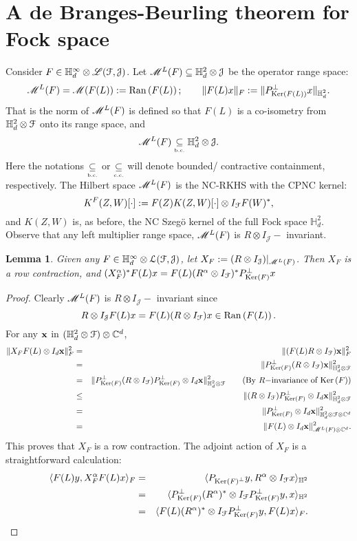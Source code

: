 \documentclass[11pt]{article}
\newcommand{\ba}{\begin{eqnarray}}
\newcommand{\ea}{\end{eqnarray}}
\newcommand{\nn}{\nonumber}
\newcommand{\scr}{\ensuremath{\mathscr}}
\newcommand{\mbf}{\ensuremath{\mathbf}}
\newcommand{\mc}{\ensuremath{\mathcal}}
\def\C{\mathbb{C}}
\def\bH{\mathbb{H}}
\def\bc{\underset{\mbox{\tiny \mbox{\tiny b.c.}}}{\subseteq}}
\def\cc{\underset{\mbox{\tiny \mbox{\tiny c.c.}}}{\subseteq}}
\newcommand{\J}{\ensuremath{\mathcal{J} }}
\renewcommand{\L}{\ensuremath{\mathscr{L} }}
\newcommand{\ip}[2]{\ensuremath{\langle {#1} , {#2} \rangle}}
\newcommand{\ran}[1]{\ensuremath{\mathrm{Ran} \left( {#1} \right) }}
\renewcommand{\ker}[1]{\ensuremath{\mathrm{Ker} \left( {#1} \right) }}
\numberwithin{equation}{section}
\numberwithin{subsection}{section}
\newtheorem{lemma}[subsection]{Lemma}
\theoremstyle{definition}
\begin{document}
\section{A de Branges-Beurling theorem for Fock space}

Consider $F \in \bH ^\infty _d  \otimes \L ( \mc{F} , \mc{J} )$.  Let $\scr{M} ^L  (F) \subseteq \bH ^2 _d \otimes \J$ be the operator range space:
$$ \scr{M} ^L  (F) =\scr{M} (F(L)) := \ran{F(L)}; \quad \quad \| F(L) x \| _{F } := \| P_{\ker{F(L)}} ^\perp x \|  _{\bH ^2 _d}. $$ That is the norm of $\scr{M} ^L  (F)$ is defined so that $F(L) $ is a co-isometry from $\bH ^2 _d \otimes \mc{F}$ onto its range space, and $$ \scr{M} ^L (F) \underset{\mbox{\tiny \mbox{\tiny b.c.}}}{\subseteq} \bH ^2 _d \otimes \J. $$ Here the notations $\bc $ or $\cc $ will denote bounded/ contractive containment, respectively. The Hilbert space $\scr{M} ^L (F)$ is the NC-RKHS with the CPNC kernel:
$$ K^F (Z,W) [ \cdot ] := F(Z) K(Z,W) [\cdot ] \otimes I_{\mc{F}} F(W) ^*, $$ and $K(Z,W)$ is, as before, the NC Szeg\"o kernel of the full Fock space $\bH ^2 _d$. Observe that any left multiplier range space, $\scr{M} ^L (F)$ is $R \otimes I_\J -$ invariant.

\begin{lemma} \label{rowcontract}
Given any $F \in \bH ^\infty _d \otimes \mc{L} (\mc{F}, \J ) $, let $X_F := (R \otimes I_\J ) | _{\scr{M} ^L (F)} $. Then $X_F$ is a row contraction, and $(X_F ^\alpha ) ^*  F(L) x  = F(L) (R^\alpha \otimes I _{\mc{F}} ) ^* P _{\ker{F}} ^\perp x $
\end{lemma}
\begin{proof}
Clearly $\scr{M} ^L (F)$ is $R \otimes I_\J -$ invariant since 
$$ R \otimes I_\J F(L) x = F(L) (R \otimes I_\mc{F} ) x \in \ran{F(L)}. $$
For any $\mbf{x}$ in $(\bH ^2 _d \otimes \mc{F}) \otimes \C^d$,
\ba \| X_F F(L) \otimes I_d \mbf{x} \| ^2 _F & = & \| (F(L) R \otimes I_{\mc{F}} ) \mbf{x} \| _F ^2 \nn \\ 
& = & \| P_{\ker{F} } ^\perp (R \otimes I_{\mc{F}} ) \mbf{x} \| _{\bH ^2 _d \otimes \mc{F} } ^2 \nn \\
& = & \| P_{\ker{F} } ^\perp (R \otimes I_{\mc{F}} ) P_{\ker{F} } ^\perp \otimes I_d \mbf{x} \| _{\bH ^2 _d \otimes \mc{F} } ^2 \quad \quad \mbox{(By $R-$invariance of $\ker{F}$)} \nn \\
& \leq & \|  (R \otimes I_{\mc{F}} ) P_{\ker{F} } ^\perp \otimes I_d  \mbf{x} \| _{\bH ^2 _d \otimes \mc{F} } ^2 \nn \\
& = &\|  P_{\ker{F} } ^\perp \otimes I_d  \mbf{x} \| _{\bH ^2 _d \otimes \mc{F} \otimes \C ^d } ^2 \nn \\
& = & \|F(L) \otimes I_d  \mbf{x} \| ^2 _{\scr{M} ^L (F ) \otimes \C ^d}. \nn \ea 
This proves that $X_F$ is a row contraction. The adjoint action of $X_F$ is a straightforward calculation:
\ba \ip{F(L) y}{X_F ^\alpha F(L) x}_F & = & \ip{P_{\ker{F} ^\perp} y}{R^\alpha \otimes I_{\mc{F}} x}_{\bH ^2} \nn \\
& = & \ip{P _{\ker{F}} ^\perp (R^{\alpha }) ^* \otimes I_{\mc{F}} P_{\ker{F}} ^\perp y}{x} _{\bH ^2 } \nn \\
& = & \ip{F(L) (R^{\alpha }) ^* \otimes I_{\mc{F}} P_{\ker{F}} ^\perp y}{F(L) x} _{F }. \nn \ea
\end{proof}
\end{document}
